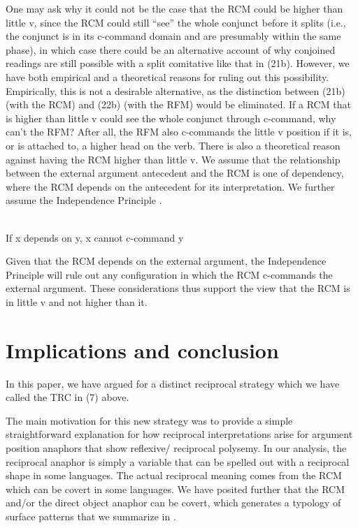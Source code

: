\documentclass[output=paper]{langsci/langscibook}
\begin{document}
  One may ask why it could not be the case that the RCM could be higher than little v, since the RCM could still “see” the whole conjunct before it splits (i.e., the conjunct is in its c-command domain and are presumably within the same phase), in which case there could be an alternative account of why conjoined readings are still possible with a split comitative like that in (21b). However, we have both empirical and a theoretical reasons for ruling out this possibility. Empirically, this is not a desirable alternative, as the distinction between (21b) (with the RCM) and (22b) (with the RFM) would be eliminated. If a RCM that is higher than little v could see the whole conjunct through c-command, why can't the RFM? After all, the RFM also c-commands the little v position if it is, or is attached to, a higher head on the verb. There is also a theoretical reason against having the RCM higher than little v. We assume that the relationship between the external argument antecedent and the RCM is one of dependency, where the RCM depends on the antecedent for its interpretation. We further assume the Independence Principle \citep{Safir2004}. 


\ea\label{ex:}
\\


  If x depends on y, x cannot c-command y

Given that the RCM depends on the external argument, the Independence Principle will rule out any configuration in which the RCM c-commands the external argument. These considerations thus support the view that the RCM is in little v and not higher than it. 

\section{Implications and conclusion}

  In this paper, we have argued for a distinct reciprocal strategy which we have called the TRC in (7) above. 

The main motivation for this new strategy was to provide a simple straightforward explanation for how reciprocal interpretations arise for argument position anaphors that show reflexive/ reciprocal polysemy. In our analysis, the reciprocal anaphor is simply a variable that can be spelled out with a reciprocal shape in some languages. The actual reciprocal meaning comes from the RCM which can be covert in some languages. We have posited further that the RCM and/or the direct object anaphor can be covert, which generates a typology of surface patterns that we summarize in .
 
\end{document}
